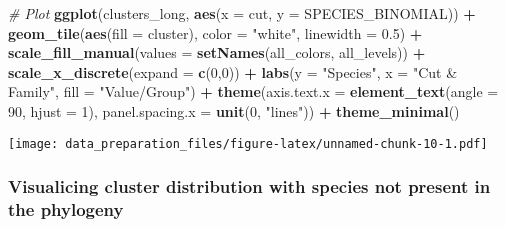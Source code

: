 \documentclass[
]{article}
\newenvironment{Shaded}{\begin{snugshade}}{\end{snugshade}}
\newcommand{\AttributeTok}[1]{\textcolor[rgb]{0.13,0.29,0.53}{#1}}
\newcommand{\CommentTok}[1]{\textcolor[rgb]{0.56,0.35,0.01}{\textit{#1}}}
\newcommand{\DecValTok}[1]{\textcolor[rgb]{0.00,0.00,0.81}{#1}}
\newcommand{\FloatTok}[1]{\textcolor[rgb]{0.00,0.00,0.81}{#1}}
\newcommand{\FunctionTok}[1]{\textcolor[rgb]{0.13,0.29,0.53}{\textbf{#1}}}
\newcommand{\NormalTok}[1]{#1}
\newcommand{\SpecialCharTok}[1]{\textcolor[rgb]{0.81,0.36,0.00}{\textbf{#1}}}
\newcommand{\StringTok}[1]{\textcolor[rgb]{0.31,0.60,0.02}{#1}}
\begin{document}
\begin{Shaded}
\begin{Highlighting}[]
\CommentTok{\# Plot}
\FunctionTok{ggplot}\NormalTok{(clusters\_long, }\FunctionTok{aes}\NormalTok{(}\AttributeTok{x =}\NormalTok{ cut, }\AttributeTok{y =}\NormalTok{ SPECIES\_BINOMIAL)) }\SpecialCharTok{+}
  \FunctionTok{geom\_tile}\NormalTok{(}\FunctionTok{aes}\NormalTok{(}\AttributeTok{fill =}\NormalTok{ cluster), }\AttributeTok{color =} \StringTok{"white"}\NormalTok{, }\AttributeTok{linewidth =} \FloatTok{0.5}\NormalTok{) }\SpecialCharTok{+}
  \FunctionTok{scale\_fill\_manual}\NormalTok{(}\AttributeTok{values =} \FunctionTok{setNames}\NormalTok{(all\_colors, all\_levels)) }\SpecialCharTok{+}
  \FunctionTok{scale\_x\_discrete}\NormalTok{(}\AttributeTok{expand =} \FunctionTok{c}\NormalTok{(}\DecValTok{0}\NormalTok{,}\DecValTok{0}\NormalTok{)) }\SpecialCharTok{+}
  \FunctionTok{labs}\NormalTok{(}\AttributeTok{y =} \StringTok{"Species"}\NormalTok{, }\AttributeTok{x =} \StringTok{"Cut \& Family"}\NormalTok{, }\AttributeTok{fill =} \StringTok{"Value/Group"}\NormalTok{) }\SpecialCharTok{+}
  \FunctionTok{theme}\NormalTok{(}\AttributeTok{axis.text.x =} \FunctionTok{element\_text}\NormalTok{(}\AttributeTok{angle =} \DecValTok{90}\NormalTok{, }\AttributeTok{hjust =} \DecValTok{1}\NormalTok{),}
        \AttributeTok{panel.spacing.x =} \FunctionTok{unit}\NormalTok{(}\DecValTok{0}\NormalTok{, }\StringTok{"lines"}\NormalTok{)) }\SpecialCharTok{+}
  \FunctionTok{theme\_minimal}\NormalTok{()}
\end{Highlighting}
\end{Shaded}

\texttt{[image: data\_preparation\_files/figure-latex/unnamed-chunk-10-1.pdf]}

\hypertarget{visualicing-cluster-distribution-with-species-not-present-in-the-phylogeny}{%
\subsubsection{Visualicing cluster distribution with species not present
in the
phylogeny}\label{visualicing-cluster-distribution-with-species-not-present-in-the-phylogeny}}
\end{document}
